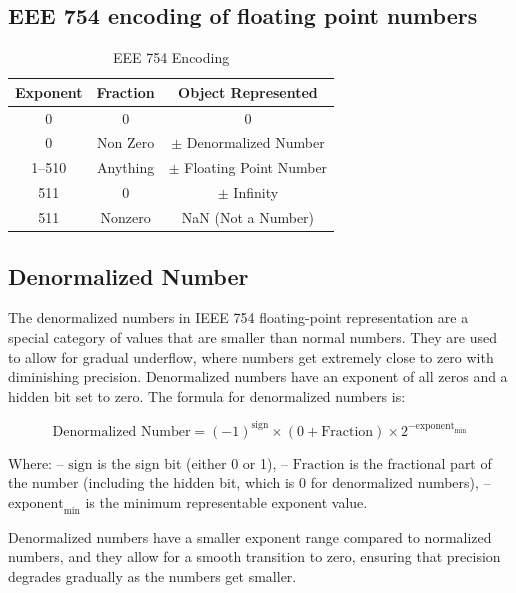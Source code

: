 \documentclass[a4paper,12pt]{article}
\begin{document}
\subsection{EEE 754 encoding of floating point numbers}
\begin{table}[h]
    \centering
    \begin{tabular}{|c|c|c|}
        \hline
        Exponent & Fraction & Object Represented          \\
        \hline
        0        & 0        & 0                           \\
        \hline
        0        & Non Zero & $\pm$ Denormalized Number   \\
        \hline
        1--510   & Anything & $\pm$ Floating Point Number \\
        \hline
        511      & 0        & $\pm$ Infinity              \\
        \hline
        511      & Nonzero  & NaN (Not a Number)          \\
        \hline
    \end{tabular}
    \caption{EEE 754 Encoding}
    \label{EEE 754 Encoding}
\end{table}

\subsection{Denormalized Number}
The denormalized numbers in IEEE 754 floating-point representation are a
special category of values that are smaller than normal numbers. They are used
to allow for gradual underflow, where numbers get extremely close to zero with
diminishing precision. Denormalized numbers have an exponent of all zeros and a
hidden bit set to zero. The formula for denormalized numbers is:

\[ \text{Denormalized Number} = (-1)^{\text{sign}} \times (0 + \text{Fraction}) \times 2^{-\text{exponent}_{\text{min}}} \]

Where: -- \(\text{sign}\) is the sign bit (either 0 or 1), --
\(\text{Fraction}\) is the fractional part of the number (including the hidden
bit, which is 0 for denormalized numbers), -- \(\text{exponent}_{\text{min}}\)
is the minimum representable exponent value.

Denormalized numbers have a smaller exponent range compared to normalized
numbers, and they allow for a smooth transition to zero, ensuring that
precision degrades gradually as the numbers get smaller.
\end{document}
